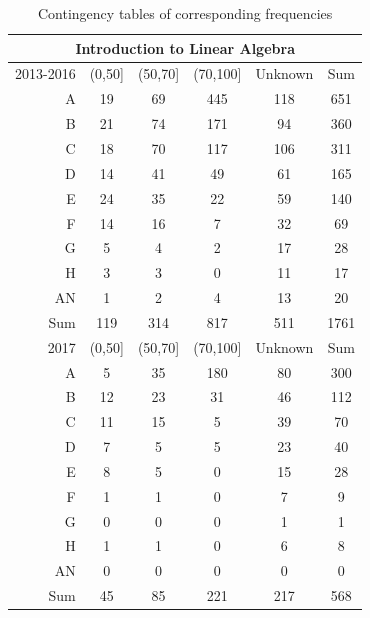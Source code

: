 \documentclass[a4paper]{report}
\begin{document}
\begin{table}[ht]
  \centering
  \begin{tabular}{r|cccc|c}
    \hline
    \multicolumn{6}{c}{\textbf{Introduction to Linear Algebra}} \\
    \hline
  2013-2016 & (0,50] & (50,70] & (70,100] & Unknown & Sum \\ 
    \hline
  A & 19 & 69 & 445 & 118 & 651 \\ 
    B & 21 & 74 & 171 & 94 & 360 \\ 
    C & 18 & 70 & 117 & 106 & 311 \\ 
    D & 14 & 41 & 49 & 61 & 165 \\ 
    E & 24 & 35 & 22 & 59 & 140 \\ 
    F & 14 & 16 & 7 & 32 & 69 \\ 
    G & 5 & 4 & 2 & 17 & 28 \\ 
    H & 3 & 3 & 0 & 11 & 17 \\ 
    AN & 1 & 2 & 4 & 13 & 20 \\ 
    \hline
    Sum & 119 & 314 & 817 & 511 & 1761 \\ 
     \hline
     \hline
    2017 & (0,50] & (50,70] & (70,100] & Unknown & Sum \\ 
      \hline
    A & 5 & 35 & 180 & 80 & 300 \\ 
      B & 12 & 23 & 31 & 46 & 112 \\ 
      C & 11 & 15 & 5 & 39 & 70 \\ 
      D & 7 & 5 & 5 & 23 & 40 \\ 
      E & 8 & 5 & 0 & 15 & 28 \\ 
      F & 1 & 1 & 0 & 7 & 9 \\ 
      G & 0 & 0 & 0 & 1 & 1 \\ 
      H & 1 & 1 & 0 & 6 & 8 \\ 
      AN & 0 & 0 & 0 & 0 & 0 \\ 
      \hline
      Sum & 45 & 85 & 221 & 217 & 568 \\ 
       \hline
  \end{tabular}
  \caption{\label{tab:REL_ILAGrade_vs_MDT}Contingency tables of corresponding frequencies}
\end{table}
\end{document}
